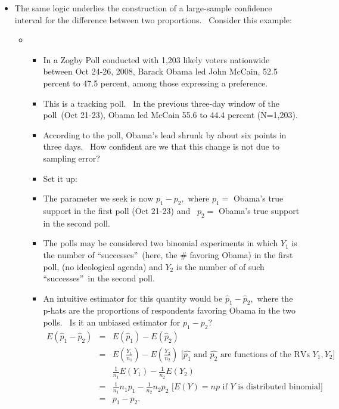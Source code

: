 \documentclass[11pt]{article}
\begin{document}
\begin{itemize}
\item The same logic underlies the construction of a large-sample confidence
interval for the difference between two proportions. \ Consider this example:

\begin{itemize}
\item 
\begin{itemize}
\item In a Zogby Poll conducted with 1,203 likely voters nationwide between
Oct 24-26, 2008, Barack Obama led John McCain, 52.5 percent to 47.5 percent,
among those expressing a preference.

\item This is a tracking poll. \ In the previous three-day window of the
poll\ (Oct 21-23), Obama led McCain 55.6 to 44.4 percent (N=1,203).

\item According to the poll, Obama's lead shrunk by about six points in
three days. \ How confident are we that this change is not due to sampling
error?

\item Set it up:

\item The parameter we seek is now $p_{1}-p_{2},$ where $p_{1}=$ Obama's
true support in the first poll (Oct 21-23) and \ $p_{2}=$ Obama's true
support in the second poll.

\item The polls may be considered two binomial experiments in which $Y_{1}$
is the number of \textquotedblleft successes\textquotedblright\ (here, the
\# favoring Obama) in the first poll, (no ideological agenda) and $Y_{2}$ is
the number of of such \textquotedblleft successes\textquotedblright\ in the
second poll.

\item An intuitive estimator for this quantity would be $\widehat{p}_{1}-%
\widehat{p}_{2},$ where the p-hats are the proportions of respondents
favoring Obama in the two polls. \ Is it an unbiased estimator for $%
p_{1}-p_{2}$? $\ $%
\begin{eqnarray*}
E(\widehat{p}_{1}-\widehat{p}_{2}) &=&E(\widehat{p}_{1})-E(\widehat{p}_{2})
\\
&=&E\left( \frac{Y_{1}}{n_{1}}\right) -E\left( \frac{Y_{2}}{n_{2}}\right) 
\text{ [}\widehat{p_{1}}\text{ and }\widehat{p_{2}}\text{ are functions of
the RVs }Y_{1},Y_{2}\text{]} \\
&&\frac{1}{n_{1}}E\left( Y_{1}\right) -\frac{1}{n_{2}}E\left( Y_{2}\right) \\
&=&\frac{1}{n_{1}}n_{1}p_{1}-\frac{1}{n_{2}}n_{2}p_{2}\text{ \ [}E\left(
Y\right) =np\text{ if }Y\text{ is distributed binomial]} \\
&=&p_{1}-p_{2}.
\end{eqnarray*}


\end{itemize}
\end{itemize}
\end{itemize}
\end{document}
